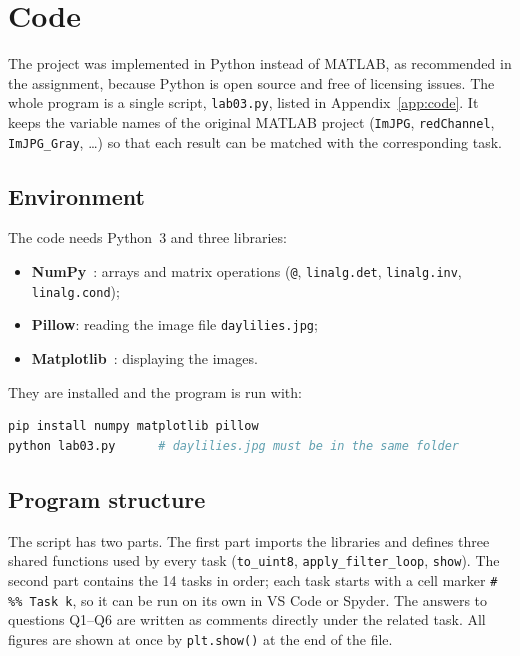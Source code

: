 \section{Code}\label{sec:code}

The project was implemented in Python instead of MATLAB, as recommended in the
assignment, because Python is open source and free of licensing issues. The
whole program is a single script, \texttt{lab03.py}, listed in
Appendix~\ref{app:code}. It keeps the variable names of the original MATLAB
project (\texttt{ImJPG}, \texttt{redChannel}, \texttt{ImJPG\_Gray}, \dots) so
that each result can be matched with the corresponding task.

\subsection{Environment}
The code needs Python~3 and three libraries:
\begin{itemize}
  \item \textbf{NumPy}~\cite{harris2020numpy}: arrays and matrix operations
        (\texttt{@}, \texttt{linalg.det}, \texttt{linalg.inv}, \texttt{linalg.cond});
  \item \textbf{Pillow}: reading the image file \texttt{daylilies.jpg};
  \item \textbf{Matplotlib}~\cite{hunter2007matplotlib}: displaying the images.
\end{itemize}
They are installed and the program is run with:
\begin{lstlisting}[language=bash,numbers=none]
pip install numpy matplotlib pillow
python lab03.py      # daylilies.jpg must be in the same folder
\end{lstlisting}

\subsection{Program structure}
The script has two parts. The first part imports the libraries and defines
three shared functions used by every task (\texttt{to\_uint8},
\texttt{apply\_filter\_loop}, \texttt{show}). The second part contains the
14 tasks in order; each task starts with a cell marker \texttt{\# \%\% Task k},
so it can be run on its own in VS Code or Spyder. The answers to questions
Q1--Q6 are written as comments directly under the related task. All figures
are shown at once by \texttt{plt.show()} at the end of the file.

